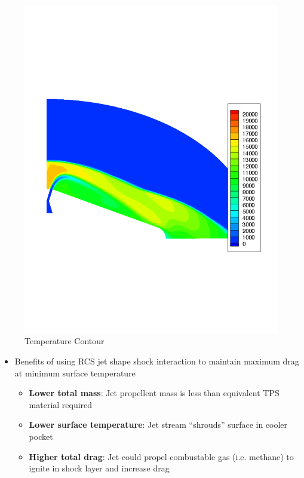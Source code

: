 \documentclass{beamer}
\begin{document}
\begin{frame}
\begin{figure}[ht]
\begin{minipage}[b]{0.4\linewidth}
         \centering
         \includegraphics[scale=0.15,trim={0 8cm 0 9cm}]{figures/from_peter/T_annular}
         \caption{\tiny Temperature Contour}
     \end{minipage}
  \end{figure}
  \vspace{-0.5cm}
  \begin{itemize}
    \item Benefits of using RCS jet
      shape shock interaction to maintain maximum drag at minimum surface temperature
      \begin{itemize}
        \item \textbf{Lower total mass}: Jet propellent mass is less than
          equivalent TPS material required
        \item \textbf{Lower surface temperature}: Jet stream ``shrouds'' surface in
           cooler pocket
        \item \textbf{Higher total drag}: Jet could propel combustable gas (i.e.
           methane) to ignite in shock layer and increase drag
      \end{itemize}
  \end{itemize}
\end{frame}
\end{document}
